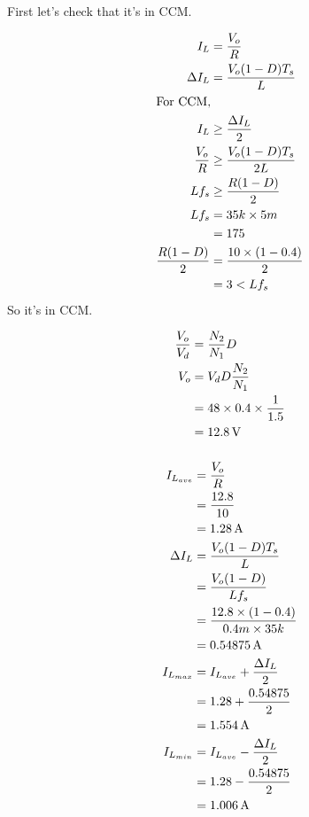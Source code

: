 \subsection{}

\subsubsection{}

First let's check that it's in CCM.


\begin{align*}
I_{L} & = \frac{V_o}{R} \\
\Delta I_L & = \frac{V_o (1-D) T_s}{L} \\
\intertext{For CCM,}
I_L & \geq \frac{\Delta I_L}{2} \\
\frac{V_o}{R} & \geq \frac{V_o (1-D) T_s}{2L} \\
Lf_s & \geq \frac{R(1-D)}{2} \\
Lf_s & = 35k \times 5m \\
     & = 175 \\
\frac{R(1-D)}{2} & = \frac{10 \times (1-0.4)}{2} \\
                 & = 3 < Lf_s
\end{align*}
So it's in CCM.

\begin{align*}
\frac{V_o}{V_d} & = \frac{N_2}{N_1} D \\
V_o & = V_d D\frac{N_2}{N_1} \\
    & = 48 \times 0.4 \times \frac{1}{1.5}\\
    & = \unit[12.8]{V}
\end{align*}

\subsubsection{}

\begin{align*}
I_{L_{ave}} & = \frac{V_o}{R} \\
            & = \frac{12.8}{10} \\
            & = \unit[1.28]{A} \\
\Delta I_L  & = \frac{V_o (1-D) T_s}{L} \\
            & = \frac{V_o (1-D)}{Lf_s} \\
            & = \frac{12.8 \times  (1-0.4)}{0.4m \times 35k} \\
            & = \unit[0.54875]{A} \\
I_{L_{max}} & = I_{L_{ave}} + \frac{\Delta I_L}{2} \\
            & = 1.28 + \frac{0.54875}{2} \\
            & = \unit[1.554]{A}\\
I_{L_{min}} & = I_{L_{ave}} - \frac{\Delta I_L}{2} \\
            & = 1.28 - \frac{0.54875}{2} \\
            & = \unit[1.006]{A}\\
\end{align*}

